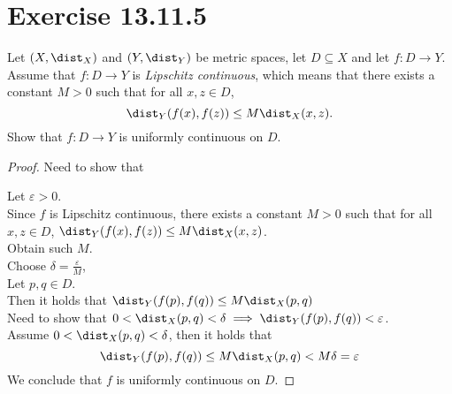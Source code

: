 \documentclass{assignment}
\begin{document}
\section{Exercise 13.11.5}
\begin{problem}
    Let $(X,\dist_X)$ and $(Y,\dist_Y)$ be metric spaces, let $D \subseteq X$ and let $f: D \to Y$. Assume that $f:D \to Y$
    is \emph{Lipschitz continuous}, which means that there exists a constant $M > 0$ such that for all $x,z \in D$,
    $$\dist_Y(f(x),f(z)) \le M\dist_X(x,z).$$
    Show that $f: D \to Y$ is uniformly continuous on $D$.
\end{problem}
\begin{proof}
    Need to show that
    \begin{myCenter}
    \end{myCenter}

    Let $\varepsilon > 0$. \\
    Since $f$ is Lipschitz continuous, there exists a constant $M > 0$ such that for all $x,z \in D$, $\dist_Y(f(x),f(z)) \le M\dist_X(x,z)$. \\
    Obtain such $M$. \\
    Choose $\delta = \frac{\varepsilon}{M}$, \\
    Let $p, q \in D$. \\
    Then it holds that $\dist_Y(f(p),f(q)) \le M\dist_X(p,q)$ \\
    Need to show that $0<\dist_X(p,q)<\delta \implies \dist_Y(f(p),f(q)) < \varepsilon$. \\
    Assume $0<\dist_X(p,q)<\delta$, then it holds that
    $$\dist_Y(f(p),f(q)) \le M\dist_X(p,q) < M\delta = \varepsilon$$
    We conclude that $f$ is uniformly continuous on $D$.
\end{proof}
\end{document}
